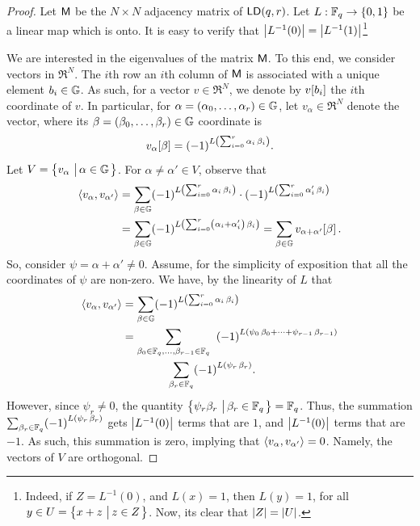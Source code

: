\begin{proof}
    Let $\mathsf{M}$ be the $N \times N$ adjacency matrix of
    $\LD{q}{r}$. Let $L:\mathbb{F}_q \rightarrow \left\{ {0,1} \right\}$ be a linear
    map which is onto. It is easy to verify that $\left| {L^{-1}(0)} \right| =
    \left| {L^{-1}(1)} \right|$\footnote{Indeed, if $Z = L^{-1}(0)$, and $L(x)
       = 1$, then $L(y)=1$, for all $y \in U = \left\{ {x+z \,\left|\, {z \in
             Z} \bigr.\right.} \right\}$. Now, its clear that $\left| {Z} \right| = \left| {U} \right|$.}

    We are interested in the eigenvalues of the matrix $\mathsf{M}$. To
    this end, we consider vectors in $\Re^N$. The $i$th row an $i$th
    column of $\mathsf{M}$ is associated with a unique element $b_i \in
    \mathbb{G}$. As such, for a vector $v \in \Re^N$, we denote by
    $v\!\left[b_i\right]$ the $i$th coordinate of $v$. In particular, for
    $\alpha =\pth{\alpha_0, \ldots, \alpha_r} \in \LSpace$, let
    $v_\alpha\in \Re^N$ denote the vector, where its $\beta
    =\pth{\beta_0, \ldots, \beta_r} \in \LSpace$ coordinate is
    \[
    \Entry{v_{\alpha}}{\beta} = \pth{-1}^{L\pth[]{\sum_{i=0}^r
          \alpha_i\, \beta_i}}.
    \]
    Let $V = \left\{ {v_\alpha \,\left|\, { \alpha \in \mathbb{G}} \bigr.\right.} \right\}$. For $\alpha
    \ne \alpha' \in V$, observe that
    \begin{align*}
    \DotProd{v_{\alpha}}{v_{\alpha'}} &= \sum_{\beta\in \LSpace}
    \pth{-1}^{L\pth[]{\sum_{i=0}^r \alpha_i\, \beta_i}} \cdot
    \pth{-1}^{L\pth[]{\sum_{i=0}^r \alpha_i'\, \beta_i}} \\
    &=
    \sum_{\beta\in \LSpace} \pth{-1}^{L\pth[]{\sum_{i=0}^r
          \pth{\alpha_i+\alpha_i'}\, \beta_i}}
    = \sum_{\beta \in \LSpace} \Entry{v_{\alpha+\alpha'}}{\beta}.
    \end{align*}
    So, consider $\psi=\alpha+\alpha' \ne 0$. Assume, for the
    simplicity of exposition that all the  coordinates of $\psi$ are
    non-zero. We have, by the linearity of $L$ that 
    \begin{align*}
    \DotProd{v_{\alpha}}{v_{\alpha'}} &= \sum_{\beta \in \LSpace}
    \pth{-1}^{L\pth[]{\sum_{i=0}^r \alpha_i\, \beta_i}} \\
    &=
    \sum_{\beta_0 \in \Field_q, \ldots, \beta_{r-1} \in \Field_q} \;\;
    \pth{-1}^{L\pth[]{ \psi_0\, \beta_0 + \cdots +
          \psi_{r-1}\,\beta_{r-1}}} \\
    &\qquad\qquad \sum_{\beta_r \in \Field_q}
    \pth{-1}^{L\pth[]{ \psi_r\, \beta_r}}.
    \end{align*}
    However, since $\psi_r \ne 0$, the quantity $\left\{ {\psi_r
       \beta_r\,\left|\, { \beta_r \in \mathbb{F}_q} \bigr.\right.} \right\} = \mathbb{F}_q$.  Thus, the
    summation $\sum_{\beta_r \in \Field_q} \pth{-1}^{L\pth[]{ \psi_r\,
          \beta_r}}$ gets $\left| {L^{-1}(0)} \right|$ terms that are $1$, and
    $\left| {L^{-1}(0)} \right|$ terms that are $-1$. As such, this summation
    is zero, implying that $\left\langle {{v_{\alpha}},{v_{\alpha'}}} \right\rangle =
    0$. Namely, the vectors of $V$ are orthogonal.


\end{proof}
